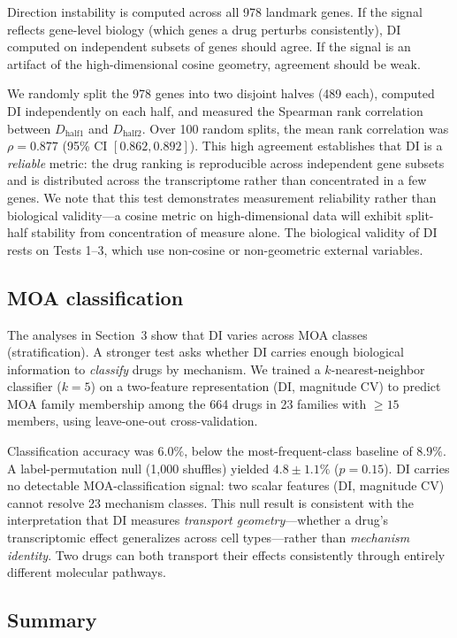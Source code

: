 \documentclass[11pt]{article}
\begin{document}
Direction instability is computed across all 978 landmark genes.  If
the signal reflects gene-level biology (which genes a drug perturbs
consistently), DI computed on independent subsets of genes should agree.
If the signal is an artifact of the high-dimensional cosine geometry,
agreement should be weak.

We randomly split the 978 genes into two disjoint halves (489 each),
computed DI independently on each half, and measured the Spearman
rank correlation between $D_{\text{half1}}$ and $D_{\text{half2}}$.
Over 100 random splits, the mean rank correlation was
$\rho = 0.877$
(95\% CI $[0.862,
0.892]$).  This high agreement establishes that DI is a \emph{reliable}
metric: the drug ranking is reproducible across independent gene subsets
and is distributed across the transcriptome rather than concentrated in
a few genes.  We note that this test demonstrates measurement
reliability rather than biological validity---a cosine metric on
high-dimensional data will exhibit split-half stability from
concentration of measure alone.  The biological validity of DI rests on
Tests 1--3, which use non-cosine or non-geometric external variables.

\subsection{MOA classification}

The analyses in Section~3 show that DI varies across MOA classes
(stratification).  A stronger test asks whether DI carries enough
biological information to \emph{classify} drugs by mechanism.  We
trained a $k$-nearest-neighbor classifier ($k = 5$) on a two-feature
representation (DI, magnitude CV) to predict MOA family membership
among the 664 drugs in 23 families with $\geq 15$
members, using leave-one-out cross-validation.

Classification accuracy was
$6.0\%$, below the most-frequent-class baseline of $8.9\%$.
A label-permutation null (1{,}000 shuffles) yielded
$4.8 \pm 1.1\%$ ($p = 0.15$).  DI carries no detectable
MOA-classification signal: two scalar features (DI, magnitude CV)
cannot resolve 23 mechanism classes.  This null result is consistent
with the interpretation that DI measures \emph{transport geometry}---whether
a drug's transcriptomic effect generalizes across cell types---rather
than \emph{mechanism identity}.  Two drugs can both transport their
effects consistently through entirely different molecular pathways.

\subsection{Summary}
\end{document}
